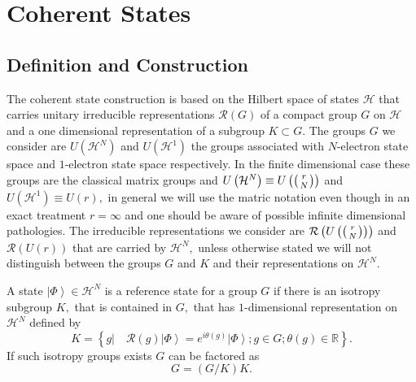 \documentclass[12pt,aps,amsfonts,amssymb,tightenlines]{revtex4}%
\begin{document}
\section{Coherent States\label{cohstate}}

\subsection{Definition and Construction\label{def}}

The coherent state construction is based on the Hilbert space of states
$\mathcal{H}$ that carries unitary irreducible representations $\mathcal{R}%
\left(  G\right)  $ of a compact group $G$ on $\mathcal{H}$ and a one
dimensional representation of a subgroup $K\subset G$. The groups $G$ we
consider are $U\left(  \mathcal{H}^{N}\right)  $ and $U\left(  \mathcal{H}%
^{1}\right)  $ the groups associated with $N$-electron state space and
$1$-electron state space respectively. In the finite dimensional case these
groups are the classical matrix groups and $U\left(  \mathcal{H}^{N}\right)
\equiv U\left(  \left(
\genfrac{}{}{0pt}{}{r}{N}%
\right)  \right)  $ and $U\left(  \mathcal{H}^{1}\right)  \equiv U\left(
r\right)  ,$ in general we will use the matric notation even though in an
exact treatment $r=\infty$ and one should be aware of possible infinite
dimensional pathologies. The irreducible representations we consider are
$\mathcal{R}\left(  U\left(  \left(
\genfrac{}{}{0pt}{}{r}{N}%
\right)  \right)  \right)  $ and $\mathcal{R}\left(  U\left(  r\right)
\right)  $ that are carried by $\mathcal{H}^{N},$ unless otherwise stated we
will not distinguish between the groups $G$ and $K$ and their representations
on $\mathcal{H}^{N}$.

A state $\left\vert \Phi\right\rangle \in\mathcal{H}^{N}$ is a reference state
for a group $G$ if there is an isotropy subgroup $K,$ that is contained in
$G,$ that has $1$-dimensional representation on $\mathcal{H}^{N}$ defined by
\begin{equation}
K=\left\{  \left.  g\right\vert \quad\mathcal{R}\left(  g\right)  \left\vert
\Phi\right\rangle =e^{i\theta\left(  g\right)  }\left\vert \Phi\right\rangle
;g\in G;\theta\left(  g\right)  \in\mathbb{R}\right\}  . \label{subgpcon}%
\end{equation}
If such isotropy groups exists $G$ can be factored as%
\begin{equation}
G=\left(  G/K\right)  K.
\end{equation}
\end{document}
